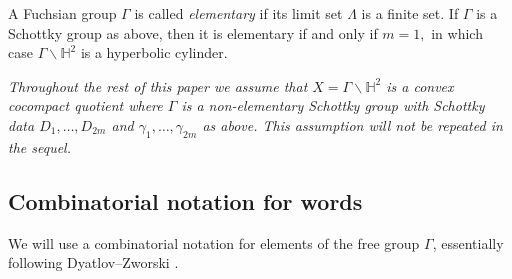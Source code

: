 \documentclass[12pt,letterpaper]{amsart}
\theoremstyle{plain}
\theoremstyle{definition}
\theoremstyle{remark}
\newcommand{\HH}{\mathbb{H}}
\begin{document}
A Fuchsian group $\Gamma$ is called \textit{elementary} if its limit set $\Lambda$ is a finite set. If $\Gamma$ is a Schottky group as above, then it is elementary if and only if $m=1,$ in which case $\Gamma\backslash \HH^2$ is a hyperbolic cylinder.

\textit{Throughout the rest of this paper we assume that $X=\Gamma\backslash \HH^2$ is a convex cocompact quotient where $\Gamma$ is a non-elementary Schottky group with Schottky data $D_1, \dots, D_{2m}$ and $\gamma_1, \dots, \gamma_{2m}$ as above. This assumption will not be repeated in the sequel.}


\subsection{Combinatorial notation for words}\label{sec:comNotation}
We will use a combinatorial notation for elements of the free group $\Gamma$, essentially following Dyatlov–Zworski \cite{DyZw18}.
\end{document}
